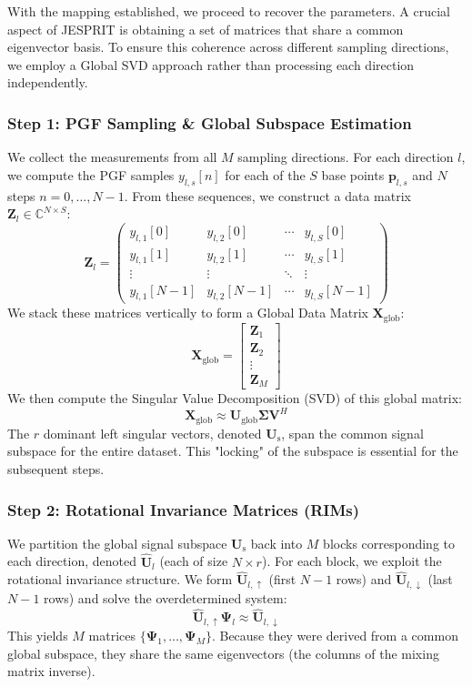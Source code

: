 With the mapping established, we proceed to recover the parameters. A crucial aspect of JESPRIT is obtaining a set of matrices that share a common eigenvector basis. To ensure this coherence across different sampling directions, we employ a Global SVD approach rather than processing each direction independently.

\subsubsection{Step 1: PGF Sampling \& Global Subspace Estimation}
We collect the measurements from all $M$ sampling directions. For each direction $l$, we compute the PGF samples $y_{l,s}[n]$ for each of the $S$ base points $\mathbf{p}_{l,s}$ and $N$ steps $n=0, \dots, N-1$.
From these sequences, we construct a data matrix $\mathbf{Z}_l \in \mathbb{C}^{N \times S}$:
$$
\mathbf{Z}_l = \begin{pmatrix}
y_{l,1}[0] & y_{l,2}[0] & \cdots & y_{l,S}[0] \\
y_{l,1}[1] & y_{l,2}[1] & \cdots & y_{l,S}[1] \\
\vdots & \vdots & \ddots & \vdots \\
y_{l,1}[N-1] & y_{l,2}[N-1] & \cdots & y_{l,S}[N-1]
\end{pmatrix}
$$
We stack these matrices vertically to form a Global Data Matrix $\mathbf{X}_{\text{glob}}$:
$$ \mathbf{X}_{\text{glob}} = \begin{bmatrix} \mathbf{Z}_1 \\ \mathbf{Z}_2 \\ \vdots \\ \mathbf{Z}_M \end{bmatrix} $$
We then compute the Singular Value Decomposition (SVD) of this global matrix:
$$ \mathbf{X}_{\text{glob}} \approx \mathbf{U}_{\text{glob}} \mathbf{\Sigma} \mathbf{V}^H $$
The $r$ dominant left singular vectors, denoted $\mathbf{U}_{\text{s}}$, span the common signal subspace for the entire dataset. This "locking" of the subspace is essential for the subsequent steps.

\subsubsection{Step 2: Rotational Invariance Matrices (RIMs)}
We partition the global signal subspace $\mathbf{U}_{\text{s}}$ back into $M$ blocks corresponding to each direction, denoted $\hat{\mathbf{U}}_l$ (each of size $N \times r$).
For each block, we exploit the rotational invariance structure. We form $\hat{\mathbf{U}}_{l, \uparrow}$ (first $N-1$ rows) and $\hat{\mathbf{U}}_{l, \downarrow}$ (last $N-1$ rows) and solve the overdetermined system:
$$ \hat{\mathbf{U}}_{l, \uparrow} \mathbf{\Psi}_l \approx \hat{\mathbf{U}}_{l, \downarrow} $$
This yields $M$ matrices $\{\mathbf{\Psi}_1, \dots, \mathbf{\Psi}_M\}$. Because they were derived from a common global subspace, they share the same eigenvectors (the columns of the mixing matrix inverse).

